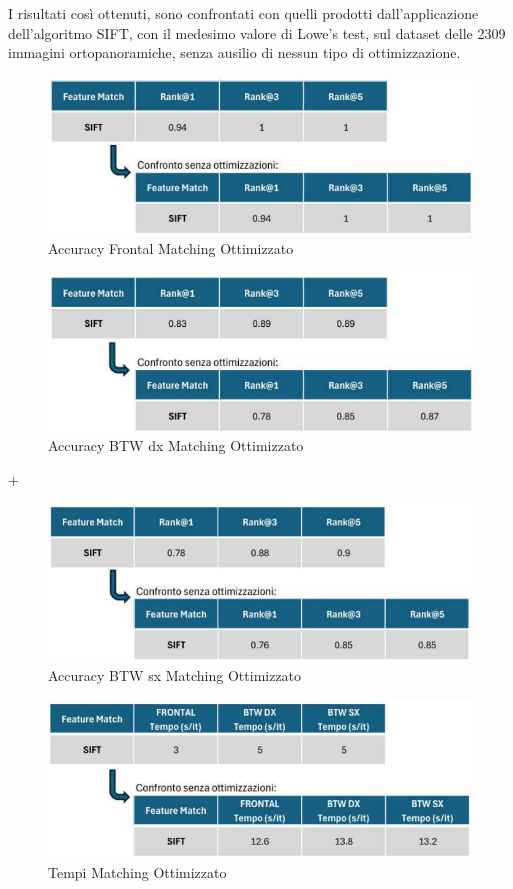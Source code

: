 \documentclass[12pt,a4paper,openright,twoside]{book}
\begin{document}
I risultati così ottenuti, sono confrontati con quelli prodotti dall'applicazione dell'algoritmo SIFT, con il medesimo valore di Lowe's test, sul dataset delle 2309 immagini ortopanoramiche, senza ausilio di nessun tipo di ottimizzazione.
\begin{figure}[H]
	\centering
	\includegraphics{figures/frontal6_1.pdf}
    	\caption{Accuracy Frontal Matching Ottimizzato}
	\label{fig:frontalopt}
\end{figure}
\begin{figure}[H]
	\centering
	\includegraphics{figures/dx6_1.pdf}
    	\caption{Accuracy BTW dx Matching Ottimizzato}
	\label{fig:dxopt}
\end{figure}+\begin{figure}[H]
	\centering
	\includegraphics{figures/sx10_1.pdf}
    	\caption{Accuracy BTW sx Matching Ottimizzato}
	\label{fig:sxopt}
\end{figure}
\begin{figure}[H]
	\centering
	\includegraphics{figures/tempi6_1.pdf}
    	\caption{Tempi Matching Ottimizzato}
	\label{fig:tempiopt}
\end{figure}
\end{document}
